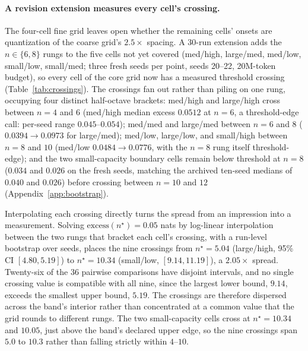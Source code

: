 \documentclass[11pt]{article}
\begin{document}
\paragraph{A revision extension measures every cell's crossing.}\label{par:crossings}
The four-cell fine grid leaves open whether the remaining cells' onsets are quantization
of the coarse grid's $2.5\times$ spacing. A 30-run extension adds the $n\in\{6,8\}$
rungs to the five cells not yet covered (med/high, large/med, med/low, small/low,
small/med; three fresh seeds per point, seeds 20--22, 20M-token budget), so every cell
of the core grid now has a measured threshold crossing (Table~\ref{tab:crossings}). The
crossings fan out rather than piling on one rung, occupying
four distinct half-octave brackets: med/high and large/high cross between $n{=}4$ and
$6$ (med/high median excess $0.0512$ at $n{=}6$, a threshold-edge call: per-seed range
$0.045$--$0.054$); med/med and large/med between $n{=}6$ and $8$ ($0.0394 \to 0.0973$
for large/med); med/low, large/low, and small/high between $n{=}8$ and $10$ (med/low
$0.0484 \to 0.0776$, with the $n{=}8$ rung itself threshold-edge); and the two
small-capacity boundary cells remain below threshold at $n{=}8$ ($0.034$ and $0.026$ on
the fresh seeds, matching the archived ten-seed medians of $0.040$ and $0.026$) before
crossing between $n{=}10$ and $12$ (Appendix~\ref{app:bootstrap}).

Interpolating each crossing directly turns the spread from an impression into a
measurement. Solving $\mathrm{excess}(n^\star) = 0.05$ nats by log-linear
interpolation between the two rungs that bracket each cell's crossing, with a
run-level bootstrap over seeds, places the nine crossings from $n^\star = 5.04$
(large/high, 95\% CI $[4.80, 5.19]$) to $n^\star = 10.34$ (small/low,
$[9.14, 11.19]$), a $2.05\times$ spread. Twenty-six of the $36$ pairwise
comparisons have disjoint intervals, and no single crossing value is compatible
with all nine, since the largest lower bound, $9.14$, exceeds the smallest upper
bound, $5.19$. The crossings are therefore dispersed across the band's interior
rather than concentrated at a common value that the grid rounds to different
rungs. The two small-capacity cells cross at $n^\star = 10.34$ and $10.05$, just
above the band's declared upper edge, so the nine crossings span $5.0$ to $10.3$
rather than falling strictly within $4$--$10$.
\end{document}
